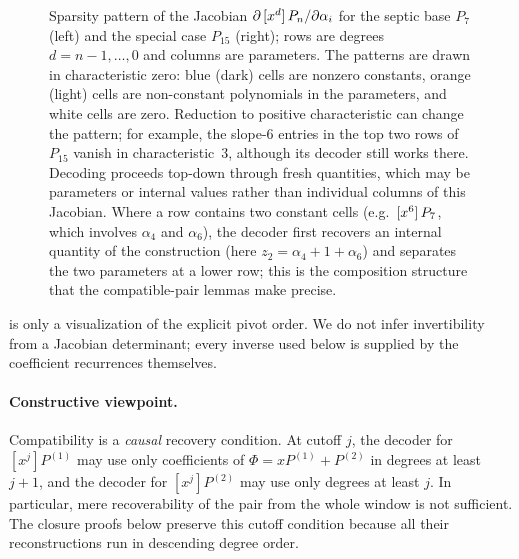 \begin{figure}[htbp]
  \centering
  \begin{minipage}[b]{0.32\textwidth}\centering\end{minipage}\hfill
  \begin{minipage}[b]{0.62\textwidth}\centering\end{minipage}
  \caption{Sparsity pattern of the Jacobian $\partial\,\coeff{P_n}{d}/\partial\alpha_i$ for the septic base $P_7$ (left) and the special case $P_{15}$ (right); rows are degrees $d=n-1,\ldots,0$ and columns are parameters.
  The patterns are drawn in characteristic zero: blue (dark) cells are nonzero constants, orange (light) cells are non-constant polynomials in the parameters, and white cells are zero.  Reduction to positive characteristic can change the pattern; for example, the slope-$6$ entries in the top two rows of $P_{15}$ vanish in characteristic~$3$, although its decoder still works there.
  Decoding proceeds top-down through fresh quantities, which may be parameters or internal values rather than individual columns of this Jacobian.
  Where a row contains two constant cells (e.g.\ $\coeff{P_7}{6}$, which involves $\alpha_4$ and $\alpha_6$), the decoder first recovers an internal quantity of the construction (here $z_2=\alpha_4+1+\alpha_6$) and separates the two parameters at a lower row; this is the composition structure that the compatible-pair lemmas make precise.}
  \label{fig:jacobian-pattern}
\end{figure}

 is only a visualization of the explicit pivot order.  We do
not infer invertibility from a Jacobian determinant; every inverse used below
is supplied by the coefficient recurrences themselves.

\paragraph{Constructive viewpoint.}
Compatibility is a \emph{causal} recovery condition.  At cutoff $j$, the
decoder for $[x^j]P^{(1)}$ may use only coefficients of
$\Phi=xP^{(1)}+P^{(2)}$ in degrees at least $j+1$, and the decoder for
$[x^j]P^{(2)}$ may use only degrees at least $j$.  In particular, mere
recoverability of the pair from the whole window is not sufficient.  The
closure proofs below preserve this cutoff condition because all their
reconstructions run in descending degree order.

